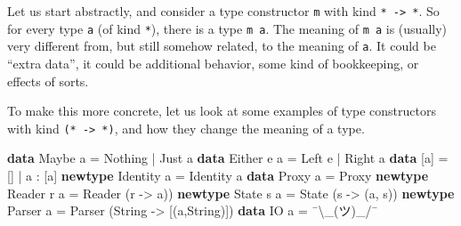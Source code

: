 \documentclass[11pt,
  american,
  DIV13]{article}
\newenvironment{Shaded}{}{}
\newcommand{\DataTypeTok}[1]{\textcolor[rgb]{0.56,0.13,0.00}{#1}}
\newcommand{\KeywordTok}[1]{\textcolor[rgb]{0.00,0.44,0.13}{\textbf{#1}}}
\newcommand{\NormalTok}[1]{#1}
\newcommand{\OperatorTok}[1]{\textcolor[rgb]{0.40,0.40,0.40}{#1}}
\newcommand{\OtherTok}[1]{\textcolor[rgb]{0.00,0.44,0.13}{#1}}
\begin{document}
Let us start abstractly, and consider a type constructor \texttt{m} with
kind \texttt{*\ -\textgreater{}\ *}. So for every type \texttt{a} (of
kind \texttt{*}), there is a type \texttt{m\ a}. The meaning of
\texttt{m\ a} is (usually) very different from, but still somehow
related, to the meaning of \texttt{a}. It could be ``extra data'', it
could be additional behavior, some kind of bookkeeping, or effects of
sorts.

To make this more concrete, let us look at some examples of type
constructors with kind \texttt{(*\ -\textgreater{}\ *)}, and how they
change the meaning of a type.

\begin{Shaded}
\begin{Highlighting}[]
\KeywordTok{data} \DataTypeTok{Maybe}\NormalTok{ a }\OtherTok{=} \DataTypeTok{Nothing} \OperatorTok{|} \DataTypeTok{Just}\NormalTok{ a}
\KeywordTok{data} \DataTypeTok{Either}\NormalTok{ e a }\OtherTok{=} \DataTypeTok{Left}\NormalTok{ e }\OperatorTok{|} \DataTypeTok{Right}\NormalTok{ a}
\KeywordTok{data}\NormalTok{ [a] }\OtherTok{=}\NormalTok{ [] }\OperatorTok{|}\NormalTok{ a }\OperatorTok{:}\NormalTok{ [a]}
\KeywordTok{newtype} \DataTypeTok{Identity}\NormalTok{ a }\OtherTok{=} \DataTypeTok{Identity}\NormalTok{ a}
\KeywordTok{data} \DataTypeTok{Proxy}\NormalTok{ a }\OtherTok{=} \DataTypeTok{Proxy}
\KeywordTok{newtype} \DataTypeTok{Reader}\NormalTok{ r a }\OtherTok{=} \DataTypeTok{Reader}\NormalTok{ (r }\OtherTok{{-}\textgreater{}}\NormalTok{ a))}
\KeywordTok{newtype} \DataTypeTok{State}\NormalTok{ s a }\OtherTok{=} \DataTypeTok{State}\NormalTok{ (s }\OtherTok{{-}\textgreater{}}\NormalTok{ (a, s))}
\KeywordTok{newtype} \DataTypeTok{Parser}\NormalTok{ a }\OtherTok{=} \DataTypeTok{Parser}\NormalTok{ (}\DataTypeTok{String} \OtherTok{{-}\textgreater{}}\NormalTok{ [(a,}\DataTypeTok{String}\NormalTok{)])}
\KeywordTok{data} \DataTypeTok{IO}\NormalTok{ a }\OtherTok{=}\NormalTok{  ¯\textbackslash{}\_(ツ)\_}\OperatorTok{/}\NormalTok{¯}
\end{Highlighting}
\end{Shaded}
\end{document}

